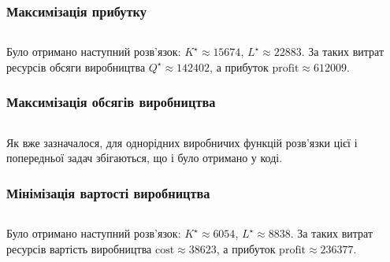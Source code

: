\subsubsection{Максимізація прибутку}

\inputminted[firstline=56,lastline=73]{python}{../py/all.py}

Було отримано наступний розв'язок: $K^\star \approx 15674$, $L^\star \approx 22883$. За таких витрат ресурсів обсяги виробництва $Q^\star \approx 142402$, а прибуток $\text{profit} \approx 612009$.

\subsubsection{Максимізація обсягів виробництва}

\inputminted[firstline=77,lastline=92]{python}{../py/all.py}

Як вже зазначалося, для однорідних виробничих функцій розв'язки цієї і попередньої задач збігаються, що і було отримано у коді.

\subsubsection{Мінімізація вартості виробництва}

\inputminted[firstline=96,lastline=112]{python}{../py/all.py}

Було отримано наступний розв'язок: $K^\star \approx 6054$, $L^\star \approx 8838$. За таких витрат ресурсів вартість виробництва $\text{cost} \approx 38623$, а прибуток $\text{profit} \approx 236377$.

